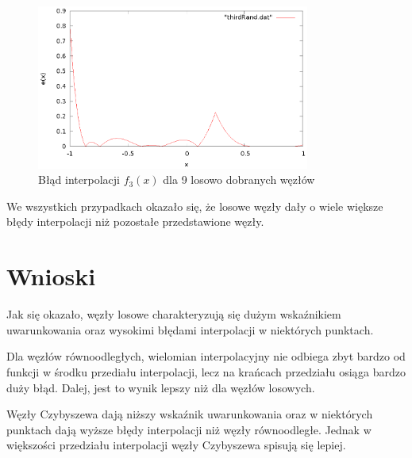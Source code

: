 \documentclass{article}
\begin{document}
\begin{figure}[H]
    \centering
    \includegraphics[width=0.8\textwidth]{wykresy/thirdRand.eps}
    \caption{Błąd interpolacji $f_3(x)$ dla 9 losowo dobranych węzłów}
\end{figure}
We wszystkich przypadkach okazało się, że losowe węzły dały o wiele większe błędy interpolacji niż pozostałe przedstawione węzły.

\section{Wnioski}

Jak się okazało, węzły losowe charakteryzują się dużym wskaźnikiem uwarunkowania oraz wysokimi błędami interpolacji w niektórych punktach.

Dla węzłów równoodległych, wielomian interpolacyjny nie odbiega zbyt bardzo od funkcji w środku przediału interpolacji, lecz na krańcach przedziału osiąga bardzo duży błąd. Dalej, jest to wynik lepszy niż dla węzłów losowych.

Węzły Czybyszewa dają niższy wskaźnik uwarunkowania oraz w niektórych punktach dają wyższe błędy interpolacji niż węzły równoodległe. Jednak w większości przedziału interpolacji węzły Czybyszewa spisują się lepiej. 
\end{document}
